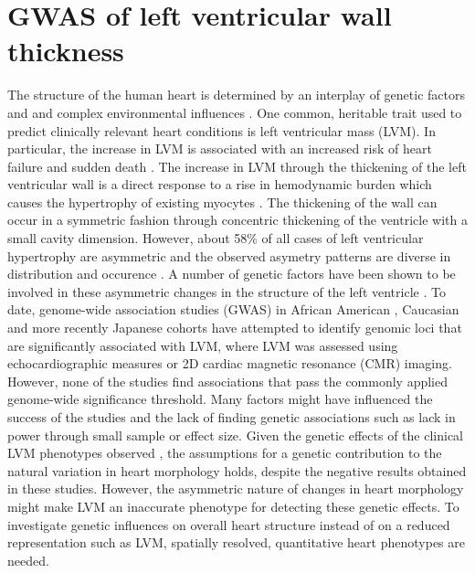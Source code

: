 \chapter{GWAS of left ventricular wall thickness}
\label{chapter:GWAS-3Dheart}
The structure of the human heart is determined by an interplay of genetic factors and and complex environmental influences \citep{Payne1995, Sanoudou2005, OToole2008}. One common, heritable trait used to predict clinically relevant heart conditions is left ventricular mass (LVM). In particular, the increase in LVM is associated with an increased risk of heart failure and sudden death \citep{Haider1998,Post1997,Lorell2000}.  The increase in LVM through the thickening of the left ventricular wall is a direct response to a rise in hemodynamic burden which causes the hypertrophy of existing myocytes \citep{Lorell2000}. The thickening of the wall can occur in a symmetric fashion through concentric thickening of the ventricle with a small cavity dimension. However, about \num{58}\%  of all cases of left ventricular hypertrophy are asymmetric \citep{Davies1995} and the observed asymetry patterns are diverse in distribution and occurence \citep{Hughes2004,Florian2012}. A number of genetic factors have been shown to be involved in these asymmetric changes in the structure of the left ventricle \citep{Davies1995,Chen1999,VanderMerwe2008}. To date, genome-wide association studies (GWAS) in African American \citep{Fox2013}, Caucasian \citep{Vasan2007, Vasan2009, Arnett2009} and more recently Japanese cohorts \citep{Sano2016} have attempted to identify genomic loci that are significantly associated with LVM, where LVM was assessed using echocardiographic measures or 2D cardiac magnetic resonance (CMR) imaging. However, none of the studies find associations that pass the commonly applied genome-wide significance threshold. Many factors might have influenced the success of the studies and the lack of finding genetic associations such as lack in power through small sample or effect size. Given the genetic effects of the clinical LVM phenotypes observed \citep{Davies1995,Chen1999,VanderMerwe2008}, the assumptions for a genetic contribution to the natural variation in heart morphology holds, despite the negative results obtained in these studies. However, the asymmetric nature of changes in heart morphology might make LVM an inaccurate phenotype for detecting these genetic effects. To investigate genetic influences on overall heart structure instead of on a reduced representation such as LVM, spatially resolved, quantitative heart phenotypes are needed. 

